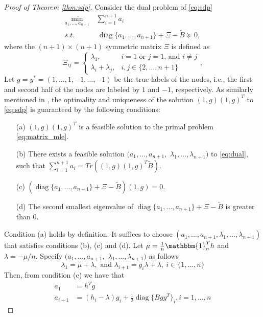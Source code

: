 \documentclass[conference]{IEEEtran}
\DeclareMathOperator{\diag}{diag}
\begin{document}
	\begin{proof}[Proof of Theorem \ref{thm:sdp}]
	Consider the dual problem of \eqref{eq:sdp}
	\begin{align}
		\min_{a_1, \dots, a_{n+1}}\, &\sum_{i=1}^{n+1} a_i \nonumber\\\label{eq:dual}
		s.t. &\, \diag\{a_1, \dots, a_{n+1}\} + \Xi - \widetilde{B} \succeq 0, 
	\end{align}
	where the $(n+1)\times (n+1)$ symmetric matrix $\Xi$ is defined as 
	\begin{equation}
		\Xi_{ij} = \begin{cases}
			\lambda_1, & i=1\text{ or }j=1 \text{, and }i\ne j\\
			\lambda_i + \lambda_j, & i, j\in\{2,\ldots,n+1\}
		\end{cases},
	\end{equation}
	Let $g=y^*=(1,\ldots,1,-1,\ldots,-1)$ be the true labels of the nodes, i.e., the first and second half of the nodes are labeled by $1$ and $-1$, respectively. As similarly mentioned in \cite{abbe2015exact},
	the optimality and uniqueness of the solution $(1,g)(1,g)^T$ to \eqref{eq:sdp} is guaranteed by the following conditions: 
	\begin{enumerate}
		\item[(a)] $(1,g)(1,g)^T$ is a feasible solution to the primal problem \eqref{eq:matrix_mle}.
		\item[(b)] There exists a feasible solution $(a_1,\ldots,a_{n+1},$ $\lambda_1,\ldots,\lambda_{n+1})$ to \eqref{eq:dual}, such that $\sum_{i=1}^{n+1} a_i=Tr((1,g)(1,g)^T\widetilde{B})$.
		\item[(c)] $(\diag\{a_1, \dots, a_{n+1}\} + \Xi - \widetilde{B})(1,g)=0$.
		\item[(d)] The second smallest eigenvalue of $\diag\{a_1, \dots, a_{n+1}\} + \Xi - \widetilde{B}$ is greater than $0$. 
	\end{enumerate}
	Condition (a) holds by definition. It suffices to choose $(a_1,\ldots,a_{n+1},\lambda_1,\ldots,\lambda_{n+1})$ that satisfies conditions (b), (c) and (d).
	Let $\mu=\frac{1}{n}\mathbbm{1}_n^T h$ and $\lambda = -\mu/n$. Specify $(a_1,\ldots,a_{n+1},$ $\lambda_1,\ldots,\lambda_{n+1})$ as follows
	$$\lambda_1=\mu+\lambda, \text{ and }\lambda_{i+1}=g_i\lambda + \lambda,~i\in\{1,\ldots,n\}$$
	Then, from condition (c) we have that
	\begin{align}
		a_1 &= h^T g \nonumber\\
		a_{i+1} & = (h_i -\lambda)g_i  + \frac{1}{2}\diag\{Bgg^T\}_i, i = 1, \dots, n

\end{align}
\end{proof}
\end{document}
